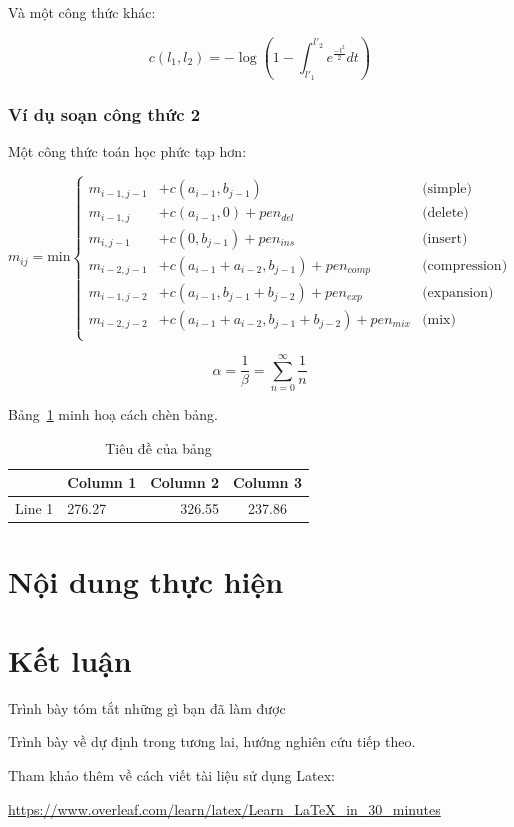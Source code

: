 \documentclass[fontsize=13pt,a4paper,oneside, DIV=calc, chapterprefix=true]{scrbook} %
\begin{document}
Và một công thức khác:

$$
c(l_1, l_2) = -\log\left(1-\int_{l'_1}^{l'_2}e^{\frac{-t^2}{2}}dt\right)
$$

\subsection{Ví dụ soạn công thức 2}
 
Một công thức toán học phức tạp hơn:

$$
m_{ij} = \mathrm{min} \left\{
    \begin{array}{lll}
      m_{i-1,j-1} & + c(a_{i-1}, b_{j-1}) & \textrm{(simple)}\\
      m_{i-1,j}   & + c(a_{i-1}, 0) + pen_{del} & \textrm{(delete)}\\
      m_{i,j-1}   & + c(0, b_{j-1}) + pen_{ins} & \textrm{(insert)}\\
      m_{i-2,j-1} & + c(a_{i-1} + a_{i-2}, b_{j-1}) + pen_{comp} & \textrm{(compression)}\\
      m_{i-1,j-2} & + c(a_{i-1}, b_{j-1} + b_{j-2}) + pen_{exp} & \textrm{(expansion)}\\
      m_{i-2,j-2} & + c(a_{i-1} + a_{i-2}, b_{j-1} + b_{j-2}) + pen_{mix} & \textrm{(mix)}\\
    \end{array}
    \right.
$$

$$\alpha = \frac{1}{\beta} =\sum_{n=0}^{\infty}\frac{1}{n}$$

Bảng~\ref{bang1} minh hoạ cách chèn bảng.

\begin{table}[h!]
\begin{center}
\begin{tabular}{ |c| l| r| c| } %
\hline
 & Column 1 & Column 2 & Column 3 \\ 
\hline
 Line 1 & 276.27 & 326.55 & 237.86 \\  
 \hline
\end{tabular}
\end{center}
\caption{Tiêu đề của bảng} 
\label{bang1}
\end{table}

\chapter{Nội dung thực hiện}

\chapter*{Kết luận}
\label{chap:concl}


Trình bày tóm tắt những gì bạn đã làm được

Trình bày về dự định trong tương lai, hướng nghiên cứu tiếp theo.

Tham khảo thêm về cách viết tài liệu sử dụng Latex:

\url{https://www.overleaf.com/learn/latex/Learn_LaTeX_in_30_minutes}

 
\end{document}
